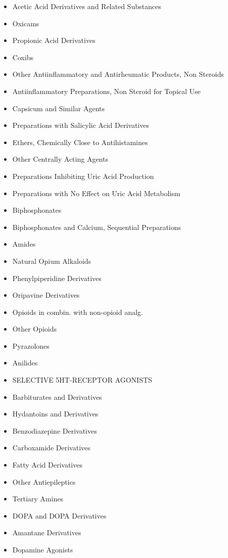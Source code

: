 \documentclass[a4paper,12pt]{article}
\begin{document}
\begin{appendices}
\begin{itemize}
   			\item Acetic Acid Derivatives and Related Substances
   			\item Oxicams
   			\item Propionic Acid Derivatives
   			\item Coxibs
   			\item Other Antiinflammatory and Antirheumatic Products, Non Steroids
   			\item Antiinflammatory Preparations, Non Steroid for Topical Use
   			\item Capsicum and Similar Agents
   			\item Preparations with Salicylic Acid Derivatives
   			\item Ethers, Chemically Close to Antihistamines
   			\item Other Centrally Acting Agents
   			\item Preparations Inhibiting Uric Acid Production
   			\item Preparations with No Effect on Uric Acid Metabolism
   			\item Biphosphonates
   			\item Biphosphonates and Calcium, Sequential Preparations
   			\item Amides
   			\item Natural Opium Alkaloids
   			\item Phenylpiperidine Derivatives
   			\item Oripavine Derivatives
   			\item Opioids in combin. with non-opioid analg.
   			\item Other Opioids
   			\item Pyrazolones
   			\item Anilides
   			\item SELECTIVE 5HT-RECEPTOR AGONISTS
   			\item Barbiturates and Derivatives
   			\item Hydantoins and Derivatives
   			\item Benzodiazepine Derivatives
   			\item Carboxamide Derivatives
   			\item Fatty Acid Derivatives
   			\item Other Antiepileptics
   			\item Tertiary Amines
   			\item DOPA and DOPA Derivatives
   			\item Amantane Derivatives
   			\item Dopamine Agonists

\end{itemize}
\end{appendices}
\end{document}
